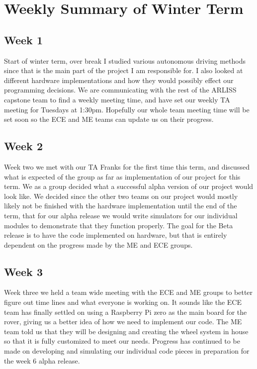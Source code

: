 \documentclass[10pt,letterpaper,onecolumn,draftclsnofoot,journal]{IEEEtran}
\begin{document}
\section{Weekly Summary of Winter Term}


\subsection{Week 1}
Start of winter term, over break I studied various autonomous driving methods since that is the main part of the project I am responsible for. I also looked at different hardware implementations and how they would possibly effect our programming decisions. We are communicating with the rest of the ARLISS capstone team to find a weekly meeting time, and have set our weekly TA meeting for Tuesdays at 1:30pm. Hopefully our whole team meeting time will be set soon so the ECE and ME teams can update us on their progress.

\subsection{Week 2}
Week two we met with our TA Franks for the first time this term, and discussed what is expected of the group as far as implementation of our project for this term. We as a group decided what a successful alpha version of our project would look like. We decided since the other two teams on our project would mostly likely not be finished with the hardware implementation until the end of the term, that for our alpha release we would write simulators for our individual modules to demonstrate that they function properly. The goal for the Beta release is to have the code implemented on hardware, but that is entirely dependent on the progress made by the ME and ECE groups.


\subsection{Week 3}
Week three we held a team wide meeting with the ECE and ME groups to better figure out time lines and what everyone is working on. It sounds like the ECE team has finally settled on using a Raspberry Pi zero as the main board for the rover, giving us a better idea of how we need to implement our code. The ME team told us that they will be designing and creating the wheel system in house so that it is fully customized to meet our needs. Progress has continued to be made on developing and simulating our individual code pieces in preparation for the week 6 alpha release.
\end{document}
